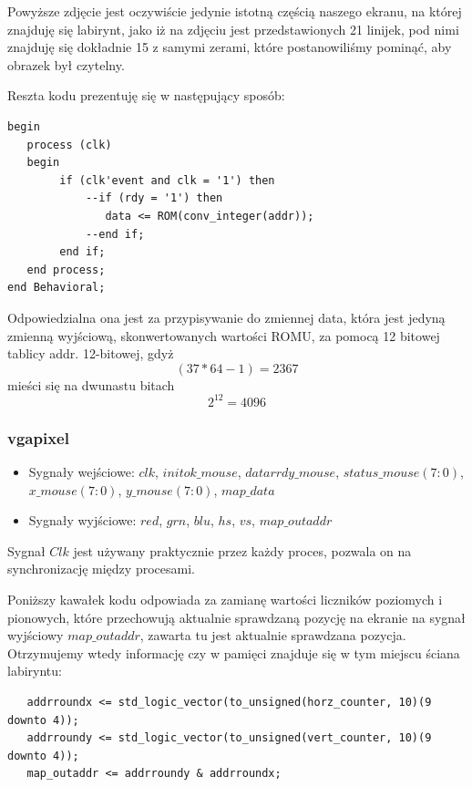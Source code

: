 \documentclass[a4paper]{article}
\begin{document}
Powyższe zdjęcie jest oczywiście jedynie istotną częścią naszego ekranu, na której znajduję się labirynt, jako iż na zdjęciu jest przedstawionych 21 linijek, pod nimi znajduję się dokładnie 15 z samymi zerami, które postanowiliśmy pominąć, aby obrazek był czytelny. 

Reszta kodu prezentuję się w następujący sposób:

\begin{verbatim}
begin
   process (clk)
   begin
        if (clk'event and clk = '1') then
            --if (rdy = '1') then
               data <= ROM(conv_integer(addr));
            --end if;
        end if;
   end process;
end Behavioral;
\end{verbatim}

Odpowiedzialna ona jest za przypisywanie do zmiennej data, która jest jedyną zmienną wyjściową, skonwertowanych wartości ROMU, za pomocą 12 bitowej tablicy addr. 12-bitowej, gdyż 
\begin{equation} (37 * 64 - 1) = 2367 \end{equation} 
mieści się na dwunastu bitach 
\begin{equation} 2^{12} = 4096\end{equation}


\subsubsection{vgapixel}
\begin{itemize}
\item Sygnały wejściowe: $clk$, $initok\_mouse$, $datarrdy\_mouse$, $status\_mouse(7:0)$, $x\_mouse(7:0)$, $y\_mouse(7:0)$, $map\_data$
\item Sygnały wyjściowe: $red$, $grn$, $blu$, $hs$, $vs$, $map\_outaddr$
\end{itemize}

Sygnał $Clk$ jest używany praktycznie przez każdy proces, pozwala on na synchronizację między procesami.

Poniższy kawałek kodu odpowiada za zamianę wartości liczników poziomych i pionowych, które przechowują aktualnie sprawdzaną pozycję na ekranie na sygnał wyjściowy $map\_outaddr$, zawarta tu jest aktualnie sprawdzana pozycja. Otrzymujemy wtedy informację czy w pamięci znajduje się w tym miejscu ściana labiryntu:
\begin{verbatim}
   addrroundx <= std_logic_vector(to_unsigned(horz_counter, 10)(9 downto 4));
   addrroundy <= std_logic_vector(to_unsigned(vert_counter, 10)(9 downto 4));
   map_outaddr <= addrroundy & addrroundx;
\end{verbatim}
\end{document}
